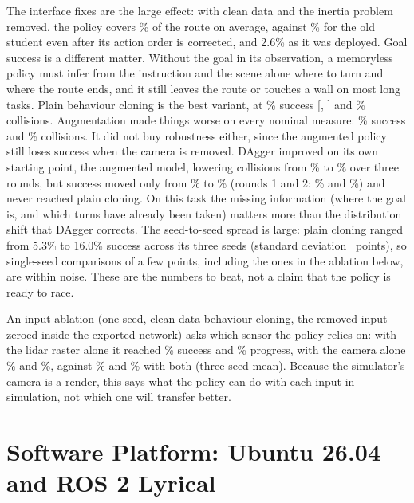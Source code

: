 \documentclass[12pt]{article}
\begin{document}
The interface fixes are the large effect: with clean data and the inertia problem removed,
the policy covers \resBcNomProg\% of the route on average, against \resBaseNomProg\% for the
old student even after its action order is corrected, and 2.6\% as it was deployed. Goal
success is a different matter. Without the goal in its observation, a memoryless policy must
infer from the instruction and the scene alone where to turn and where the route ends, and it
still leaves the route or touches a wall on most long tasks. Plain behaviour cloning is the best
variant, at \resBcNomSucc\% success [\resBcNomSuccLo, \resBcNomSuccHi] and \resBcNomColl\%
collisions. Augmentation made things worse on every nominal measure: \resBcaugNomSucc\% success
and \resBcaugNomColl\% collisions. It did not buy robustness either, since the augmented policy
still loses success when the camera is removed. DAgger improved on its own starting point, the
augmented model, lowering collisions from \resBcaugNomColl\% to \resDgthreeNomColl\% over three
rounds, but success moved only from \resBcaugNomSucc\% to \resDgthreeNomSucc\% (rounds 1 and 2:
\resDgoneNomSucc\% and \resDgtwoNomSucc\%) and never reached plain cloning. On this task the
missing information (where the goal is, and which turns have already been taken) matters more
than the distribution shift that DAgger corrects. The seed-to-seed spread is large: plain
cloning ranged from 5.3\% to 16.0\% success across its three seeds (standard deviation
\resBcNomSuccSd\ points), so single-seed comparisons of a few points, including the ones in the
ablation below, are within noise. These are the numbers to beat, not a claim that the policy is
ready to race.

An input ablation (one seed, clean-data behaviour cloning, the removed input zeroed inside the
exported network) asks which sensor the policy relies on: with the lidar raster alone it reached
\resAbllidNomSucc\% success and \resAbllidNomProg\% progress, with the camera alone
\resAblcamNomSucc\% and \resAblcamNomProg\%, against \resBcNomSucc\% and \resBcNomProg\% with
both (three-seed mean). Because the simulator's camera is a render, this says what the policy
can do with each input in simulation, not which one will transfer better.

\section*{Software Platform: Ubuntu 26.04 and ROS 2 Lyrical}
\label{sec:lyrical}
\end{document}
